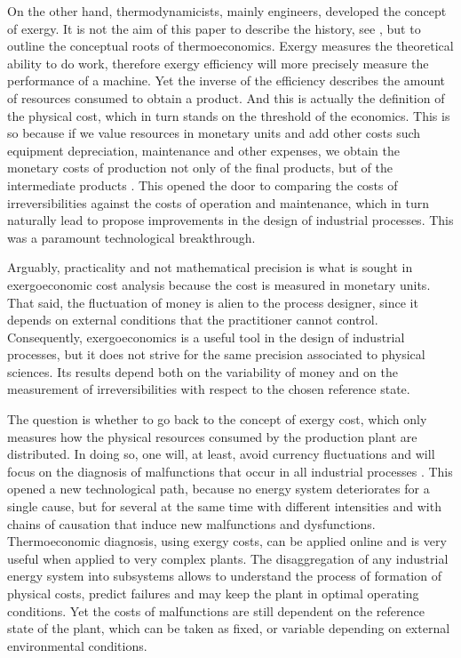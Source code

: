 \documentclass[energies,article,submit,moreauthors,pdftex]{Definitions/mdpi}
\begin{document}
On the other hand, thermodynamicists, mainly engineers, developed the concept of exergy. It is not the aim of this paper to describe the history, see \cite{Sciubba2007}, but to outline the conceptual roots of thermoeconomics. Exergy measures the theoretical ability to do work, therefore exergy efficiency will more precisely measure the performance of a machine. Yet the inverse of the efficiency describes the amount of resources consumed to obtain a product. And this is actually the definition of the physical cost, which in turn stands on the threshold of the economics. This is so because if we value resources in monetary units and add other costs such equipment depreciation, maintenance and other expenses, we obtain the monetary costs of production not only of the final products, but of the intermediate products \cite{Tribus1962,ElSayed1970a, Tsatsaronis1985b}. This opened the door to comparing the costs of irreversibilities against the costs of operation and maintenance, which in turn naturally lead to propose improvements in the design of industrial processes. This was a paramount technological breakthrough.

Arguably, practicality and not mathematical precision is what is sought in exergoeconomic cost analysis because the cost is measured in monetary units. That said, the fluctuation of money is alien to the process designer, since it depends on external conditions that the practitioner cannot control. Consequently, exergoeconomics is a useful tool in the design of industrial processes, but it does not strive for the same precision associated to physical sciences. Its results depend both on the variability of money and on the measurement of irreversibilities with respect to the chosen reference state.

The question is whether to go back to the concept of exergy cost, which only measures how the physical resources consumed by the production plant are distributed. In doing so, one will, at least, avoid currency fluctuations and will focus on the diagnosis of malfunctions that occur in all industrial processes \cite{Valero2004}. This opened a new technological path, because no energy system deteriorates for a single cause, but for several at the same time with different intensities and with chains of causation that induce new malfunctions and dysfunctions. Thermoeconomic diagnosis, using exergy costs, can be applied online and is very useful when applied to very complex plants. The disaggregation of any industrial energy system into subsystems allows to understand the process of formation of physical costs, predict failures and may keep the plant in optimal operating conditions. Yet the costs of malfunctions are still dependent on the reference state of the plant, which can be taken as fixed, or variable depending on external environmental conditions.
\end{document}
